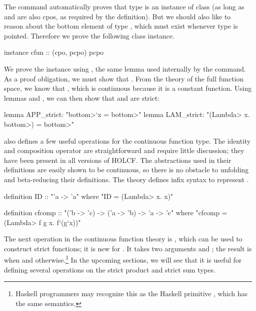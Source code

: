 The  command automatically proves that type  is an instance of class  (as long as  and  are also cpos, as required by the definition). But we should also like to reason about the bottom element of type , which must exist whenever type  is pointed. Therefore we prove the following class instance.
%
\begin{isacode}
instance cfun :: (cpo, pcpo) pcpo
\end{isacode}
%
We prove the instance using , the same lemma used internally by the  command. As a proof obligation, we must show that . From the theory of the full function space, we know that , which is continuous because it is a constant function. Using lemmas  and , we can then show that  and  are strict:
%
\begin{isacodes}
lemma APP_strict: "\<bottom>`x = \<bottom>"
lemma LAM_strict: "(\<Lambda> x. \<bottom>) = \<bottom>"
\end{isacodes}
%
 also defines a few useful operations for the continuous function type. The identity and composition operator are straightforward and require little discussion; they have been present in all versions of HOLCF. The abstractions used in their definitions are easily shown to be continuous, so there is no obstacle to unfolding and beta-reducing their definitions. The theory defines infix syntax  to represent .
%
\begin{isacode}
definition ID :: "'a -> 'a"
  where "ID = (\<Lambda> x. x)"
\end{isacode}
\unmedskip
{}
\begin{isacode}
definition cfcomp :: "('b -> 'c) -> ('a -> 'b) -> 'a -> 'c"
  where "cfcomp = (\<Lambda> f g x. f`(g`x))"
\end{isacode}
%
The next operation in the continuous function theory is , which can be used to construct strict functions; it is new for . It takes two arguments  and ; the result is  when  and  otherwise.\footnote{Haskell programmers may recognize this as the Haskell primitive , which has the same semantics.} In the upcoming sections, we will see that it is useful for defining several operations on the strict product and strict sum types.

